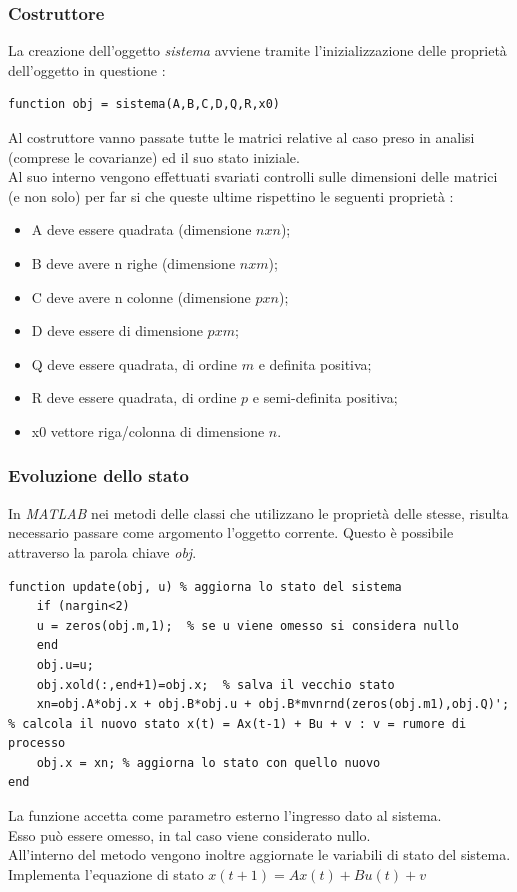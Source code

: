 \subsubsection{Costruttore}
La creazione dell'oggetto \textit{sistema} avviene tramite l'inizializzazione delle proprietà dell'oggetto in questione :
\begin{lstlisting}[frame=single]
function obj = sistema(A,B,C,D,Q,R,x0)
\end{lstlisting}
Al costruttore vanno passate tutte le matrici relative al caso preso in analisi (comprese le covarianze) ed il suo stato iniziale.\\
Al suo interno vengono effettuati svariati controlli sulle dimensioni delle matrici (e non solo) per far si che queste ultime rispettino le seguenti proprietà :
\begin{itemize}
\item A deve essere quadrata (dimensione $nxn$);
\item B deve avere n righe (dimensione $nxm$);
\item C deve avere n colonne (dimensione $pxn$);
\item D deve essere di dimensione $pxm$;
\item Q deve essere quadrata, di ordine $m$ e definita positiva;
\item R deve essere quadrata, di ordine $p$ e semi-definita positiva;
\item x0 vettore riga/colonna di dimensione $n$.
\end{itemize}

\subsubsection{Evoluzione dello stato}
In \textit{MATLAB} nei metodi delle classi che utilizzano le proprietà delle stesse, risulta necessario passare come argomento l'oggetto corrente. Questo è possibile attraverso la parola chiave \textit{obj}.
\begin{lstlisting}[frame=single]
function update(obj, u) % aggiorna lo stato del sistema 
    if (nargin<2)
	u = zeros(obj.m,1);  % se u viene omesso si considera nullo
    end
    obj.u=u;            
    obj.xold(:,end+1)=obj.x;  % salva il vecchio stato
    xn=obj.A*obj.x + obj.B*obj.u + obj.B*mvnrnd(zeros(obj.m1),obj.Q)'; % calcola il nuovo stato x(t) = Ax(t-1) + Bu + v : v = rumore di processo
    obj.x = xn;	% aggiorna lo stato con quello nuovo            
end
\end{lstlisting}
La funzione accetta come parametro esterno l'ingresso dato al sistema.\\
Esso può essere omesso, in tal caso viene considerato nullo.\\
All'interno del metodo vengono inoltre aggiornate le variabili di stato del sistema.\\
Implementa l'equazione di stato $x(t+1)=Ax(t)+Bu(t)+v$
\newpage
